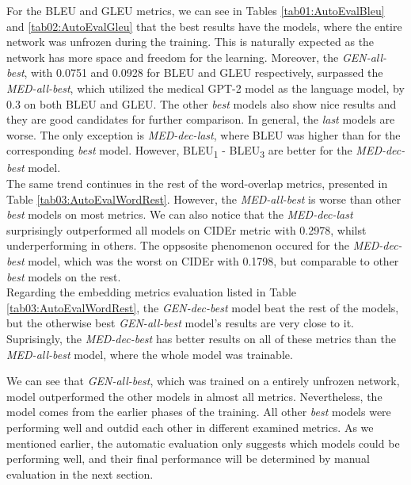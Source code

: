 For the BLEU and GLEU metrics, we can see in Tables \ref{tab01:AutoEvalBleu} and \ref{tab02:AutoEvalGleu} that the best results have the models, where the entire network was unfrozen during the training. This is naturally expected as the network has more space and freedom for the learning. Moreover, the \textit{GEN-all-best}, with 0.0751 and 0.0928 for BLEU and GLEU respectively, surpassed the \textit{MED-all-best}, which utilized the medical GPT-2 model as the language model, by 0.3 on both BLEU and GLEU. The other \textit{best} models also show nice results and they are good candidates for further comparison. In general, the \textit{last} models are worse. The only exception is \textit{MED-dec-last}, where BLEU was higher than for the corresponding \textit{best} model. However, BLEU\textsubscript{1} - BLEU\textsubscript{3} are better for the \textit{MED-dec-best} model.\\ 

The same trend continues in the rest of the word-overlap metrics, presented in Table \ref{tab03:AutoEvalWordRest}. However, the \textit{MED-all-best} is worse than other \textit{best} models on most metrics. We can also notice that the \textit{MED-dec-last} surprisingly outperformed all models on CIDEr metric with 0.2978, whilst underperforming in others. The oppsosite phenomenon occured for the \textit{MED-dec-best} model, which was the worst on CIDEr with 0.1798, but comparable to other \textit{best} models on the rest.\\

Regarding the embedding metrics evaluation listed in Table \ref{tab03:AutoEvalWordRest}, the \textit{GEN-dec-best} model beat the rest of the models, but the otherwise best \textit{GEN-all-best} model's results are very close to it. Suprisingly, the \textit{MED-dec-best} has better results on all of these metrics than the \textit{MED-all-best} model, where the whole model was trainable.\\
\newpage

We can see that \textit{GEN-all-best}, which was trained on a entirely unfrozen network, model outperformed the other models in almost all metrics. Nevertheless, the model comes from the earlier phases of the training. All other \textit{best} models were performing well and outdid each other in different examined metrics. As we mentioned earlier, the automatic evaluation only suggests which models could be performing well, and their final performance will be determined by manual evaluation in the next section.

